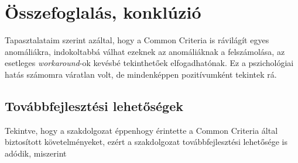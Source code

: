 \chapter{Összefoglalás, konklúzió}

Tapasztalataim szerint azáltal, hogy a Common Criteria is rávilágít egyes anomáliákra, indokoltabbá
válhat ezeknek az anomáliáknak a felszámolása, az esetleges \emph{workaround}-ok kevésbé
tekinthetőek elfogadhatónak. Ez a pszichológiai hatás számomra váratlan volt, de mindenképpen
pozitívumként tekintek rá.

\section{Továbbfejlesztési lehetőségek}
Tekintve, hogy a szakdolgozat éppenhogy érintette a Common Criteria által biztosított
követelményeket, ezért a szakdolgozat továbbfejlesztési lehetősége is adódik, miszerint 
